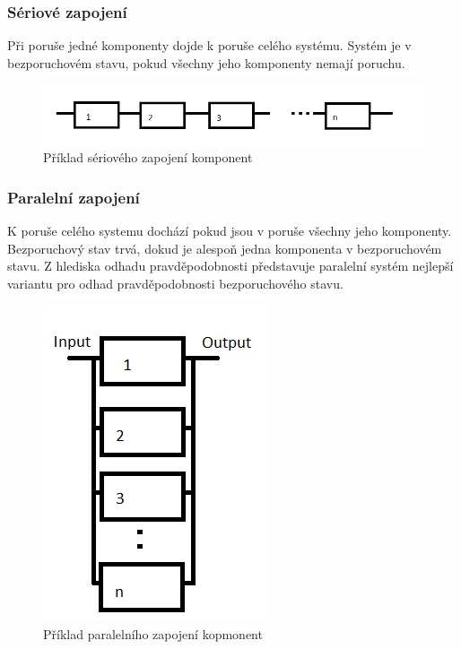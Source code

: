 \documentclass[FM,RP]{tulthesis}
\begin{document}
        \subsubsection*{Sériové zapojení}
            Při poruše jedné komponenty dojde k poruše celého systému. 
            Systém je v bezporuchovém stavu, pokud všechny jeho komponenty nemají poruchu.\cite{5}
            \begin{figure}[h]
                \centering
                \includegraphics[scale=0.75]{pic/seriove.png}
                \caption{Příklad sériového zapojení komponent} \label{Obrázek č. 2.1}
            \end{figure}

        \subsubsection*{Paralelní zapojení}
            K poruše celého systemu dochází pokud jsou v poruše všechny jeho komponenty. Bezporuchový stav trvá, dokud je alespoň jedna komponenta v bezporuchovém stavu.
            Z hlediska odhadu pravděpodobnosti představuje paralelní systém nejlepší variantu pro odhad pravděpodobnosti bezporuchového stavu.\cite{5}
            \begin{figure}[h]
                \centering
                \includegraphics[scale=0.75]{pic/paralelni.png}
                \caption{Příklad paralelního zapojení kopmonent} \label{Obrázek č. 2.1}
            \end{figure}
\end{document}
